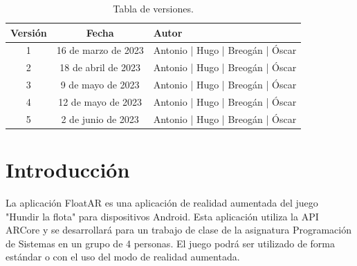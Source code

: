\documentclass[a4paper, openright, 12pt]{article}
\begin{document}
\newpage



\tableofcontents

\vspace{5cm}

\begin{flushright}
\begin{table}[hbtp]
\begin{center}

\caption{Tabla de versiones.}
\label{tabla:versiones}
\small
\vspace{1ex}

\begin{tabular}{|c|c|l|}
\hline
Versión & Fecha & Autor \\
\hline \hline
1 & 16 de marzo de 2023 & Antonio | Hugo | Breogán | Óscar\\ \hline \hline
2 & 18 de abril de 2023 & Antonio | Hugo | Breogán | Óscar\\ \hline \hline
3 & 9 de mayo de 2023 & Antonio | Hugo | Breogán | Óscar \\ \hline
4 & 12 de mayo de 2023 & Antonio | Hugo | Breogán | Óscar \\ \hline
5 & 2 de junio de 2023 & Antonio | Hugo | Breogán | Óscar \\ \hline
\end{tabular}

\end{center}
\end{table}
\end{flushright}

\newpage

\section{Introducción}\label{cap.introduccion}
La aplicación FloatAR es una aplicación de realidad aumentada del juego "Hundir la flota" para dispositivos Android. Esta aplicación utiliza la API ARCore y se desarrollará para un trabajo de clase de la asignatura Programación de Sistemas en un grupo de 4 personas. El juego podrá ser utilizado de forma estándar o con el uso del modo de realidad aumentada.
\end{document}

